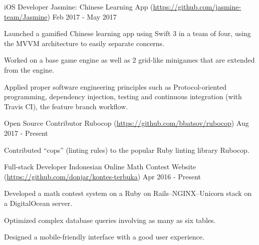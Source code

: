 

\begin{cventries}

	\cventry
	{iOS Developer} %
	{Jasmine: Chinese Learning App (\url{https://github.com/jasmine-team/Jasmine})} %
	{} %
	{Feb 2017 - May 2017} %
	{
		\begin{cvitems} %
		\item {Launched a gamified Chinese learning app using Swift 3 in a team of four, using the MVVM architecture to easily separate concerns.}
		\item {Worked on a base game engine as well as 2 grid-like minigames that are extended from the engine.}
		\item {Applied proper software engineering principles such as Protocol-oriented programming, dependency injection, testing and continuous integration (with Travis CI), the feature branch workflow.}
		\end{cvitems}
	}

	\cventry
	{Open Source Contributor} %
	{Rubocop (\url{https://github.com/bbatsov/rubocop})} %
	{} %
	{Aug 2017 - Present} %
	{
		\begin{cvitems} %
		\item {Contributed ``cops'' (linting rules) to the popular Ruby linting library Rubocop.}
		\end{cvitems}
	}

	\cventry
	{Full-stack Developer} %
	{Indonesian Online Math Contest Website (\url{https://github.com/donjar/kontes-terbuka})} %
	{} %
	{Apr 2016 - Present} %
	{
		\begin{cvitems} %
		\item {Developed a math contest system on a Ruby on Rails--NGINX--Unicorn stack on a DigitalOcean server.}
		\item {Optimized complex database queries involving as many as six tables.}
		\item {Designed a mobile-friendly interface with a good user experience.}
		\end{cvitems}
	}

\end{cventries}
